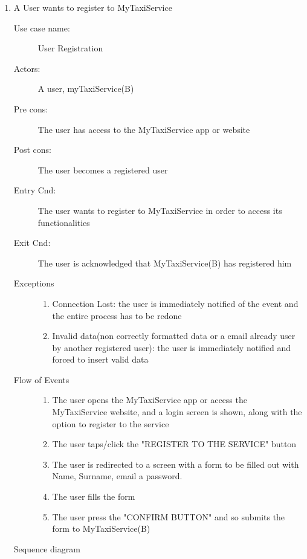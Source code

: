 \documentclass[11pt]{article} %
\begin{document}
\begin{enumerate}
	       \item A User wants to register to MyTaxiService
		\begin{description}
		        \item [Use case name:] User Registration
		        \item [Actors:] A user, myTaxiService(B)
		        \item [Pre cons:] The user has access to the MyTaxiService app or website
		        \item [Post cons:] The user becomes a registered user
		        \item [Entry Cnd:] The user wants to register to MyTaxiService in order
		        to access its functionalities
		        \item [Exit Cnd:] The user is acknowledged that MyTaxiService(B) has registered him
		        \item [Exceptions]\hfill
			\begin{enumerate}
			          \item Connection Lost: the user is immediately notified of the event and the entire process
			          has to be redone
			          \item Invalid data(non correctly formatted data or a email already
			          user by another registered user): the user is immediately notified and forced to insert valid data
			\end{enumerate}
		        \item [Flow of Events]\hfill
			\begin{enumerate}
			          \item The user opens the MyTaxiService app or access the MyTaxiService website, and a login
			            screen is shown, along with the option to register to the service
			          \item The user taps/click the "REGISTER TO THE SERVICE" button
			          \item The user is redirected to a screen with a form to be filled out with Name, Surname, email a password.
			          \item The user fills the form
			          \item The user press the "CONFIRM BUTTON" and so submits the form to MyTaxiService(B)
			\end{enumerate}
		\end{description}
		Sequence diagram
		\begin{center}

\end{center}
\end{enumerate}
\end{document}
